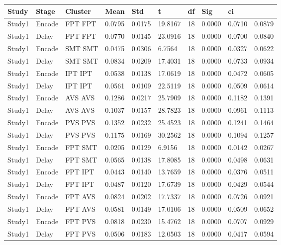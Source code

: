 \begin{table}[!hbt]
\centering
\begin{tabular}[0.2em]{@{}llllllllll@{}}\toprule
Study & Stage & Cluster & Mean & Std & t & df & Sig & ci\\\toprule[0.2em]
Study1 & Encode & FPT FPT & 0.0795 & 0.0175 & 19.8167 & 18 & 0.0000 & 0.0710 & 0.0879 \\\midrule
Study1 & Delay & FPT FPT & 0.0770 & 0.0145 & 23.0916 & 18 & 0.0000 & 0.0700 & 0.0840 \\\midrule
Study1 & Encode & SMT SMT & 0.0475 & 0.0306 & 6.7564 & 18 & 0.0000 & 0.0327 & 0.0622 \\\midrule
Study1 & Delay & SMT SMT & 0.0834 & 0.0209 & 17.4031 & 18 & 0.0000 & 0.0733 & 0.0934 \\\midrule
Study1 & Encode & IPT IPT & 0.0538 & 0.0138 & 17.0619 & 18 & 0.0000 & 0.0472 & 0.0605 \\\midrule
Study1 & Delay & IPT IPT & 0.0561 & 0.0109 & 22.5119 & 18 & 0.0000 & 0.0509 & 0.0614 \\\midrule
Study1 & Encode & AVS AVS & 0.1286 & 0.0217 & 25.7909 & 18 & 0.0000 & 0.1182 & 0.1391 \\\midrule
Study1 & Delay & AVS AVS & 0.1037 & 0.0157 & 28.7823 & 18 & 0.0000 & 0.0961 & 0.1113 \\\midrule
Study1 & Encode & PVS PVS & 0.1352 & 0.0232 & 25.4523 & 18 & 0.0000 & 0.1241 & 0.1464 \\\midrule
Study1 & Delay & PVS PVS & 0.1175 & 0.0169 & 30.2562 & 18 & 0.0000 & 0.1094 & 0.1257 \\\midrule
Study1 & Encode & FPT SMT & 0.0205 & 0.0129 & 6.9156 & 18 & 0.0000 & 0.0142 & 0.0267 \\\midrule
Study1 & Delay & FPT SMT & 0.0565 & 0.0138 & 17.8085 & 18 & 0.0000 & 0.0498 & 0.0631 \\\midrule
Study1 & Encode & FPT IPT & 0.0443 & 0.0140 & 13.7659 & 18 & 0.0000 & 0.0376 & 0.0511 \\\midrule
Study1 & Delay & FPT IPT & 0.0487 & 0.0120 & 17.6739 & 18 & 0.0000 & 0.0429 & 0.0544 \\\midrule
Study1 & Encode & FPT AVS & 0.0824 & 0.0202 & 17.7337 & 18 & 0.0000 & 0.0726 & 0.0921 \\\midrule
Study1 & Delay & FPT AVS & 0.0581 & 0.0149 & 17.0106 & 18 & 0.0000 & 0.0509 & 0.0652 \\\midrule
Study1 & Encode & FPT PVS & 0.0818 & 0.0230 & 15.4762 & 18 & 0.0000 & 0.0707 & 0.0929 \\\midrule
Study1 & Delay & FPT PVS & 0.0506 & 0.0183 & 12.0503 & 18 & 0.0000 & 0.0417 & 0.0594 \\\midrule

\end{tabular}
\end{table}
